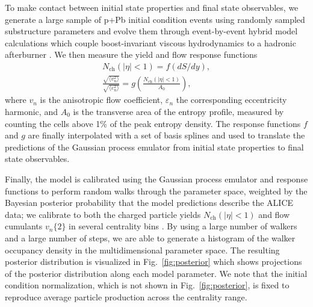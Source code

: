 \documentclass[3p,times,procedia]{elsarticle}
\newcommand{\vn}{\sqrt{\langle v_n^2 \rangle}}
\newcommand{\en}{\sqrt{\langle \varepsilon_n^2 \rangle}}
\begin{document}
To make contact between initial state properties and final state observables, we generate a large sample of p+Pb initial condition events using randomly sampled substructure parameters and evolve them through event-by-event hybrid model calculations which couple boost-invariant viscous hydrodynamics to a hadronic afterburner \cite{Shen:2014vra}.
We then measure the yield and flow response functions 
\begin{align}
  \label{response}
  N_\mathrm{ch}(|\eta| < 1) = f(dS/dy), \\
  \label{hydro_response}
  \frac{\vn}{\en} = g\left(\frac{N_\mathrm{ch}(|\eta| < 1)}{A_0}\right),
\end{align}
where $v_n$ is the anisotropic flow coefficient, $\varepsilon_n$ the corresponding eccentricity harmonic, and $A_0$ is the transverse area of the entropy profile, measured by counting the cells above 1\% of the peak entropy density. 
The response functions $f$ and $g$ are finally interpolated with a set of basis splines and used to translate the predictions of the Gaussian process emulator from initial state properties to final state observables. 

Finally, the model is calibrated using the Gaussian process emulator and response functions to perform random walks through the parameter space, weighted by the Bayesian posterior probability that the model predictions describe the ALICE data; we calibrate to both the charged particle yields $N_\mathrm{ch}(|\eta| < 1)$ and flow cumulants $v_n\{2\}$ in several centrality bins \cite{Abelev:2014mda}.
By using a large number of walkers and a large number of steps, we are able to generate a histogram of the walker occupancy density in the multidimensional parameter space.
The resulting posterior distribution is visualized in Fig.~\ref{fig:posterior} which shows projections of the posterior distribution along each model parameter.
We note that the initial condition normalization, which is not shown in Fig.~\ref{fig:posterior}, is fixed to reproduce average particle production across the centrality range.
\end{document}
